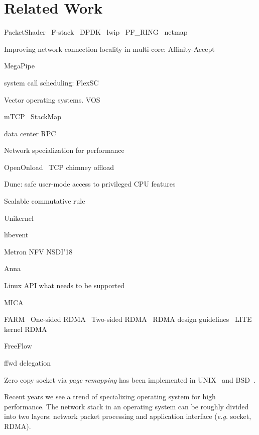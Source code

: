 \section{Related Work}
\label{sec:related}

PacketShader~\cite{han2010packetshader}
F-stack~\cite{fstack}
DPDK~\cite{dpdk} lwip~\cite{dunkels2001design}
PF\_RING~\cite{pf_ring}
netmap~\cite{rizzo2012netmap}

Improving network connection locality in multi-core:
Affinity-Accept~\cite{pesterev2012improving}


MegaPipe~\cite{han2012megapipe}

system call scheduling:
FlexSC~\cite{soares2010flexsc}

Vector operating systems.
VOS~\cite{vasudevan2011case}

mTCP~\cite{jeong2014mtcp}
StackMap~\cite{yasukata2016stackmap}

data center RPC~\cite{stuedi2014darpc}

Network specialization for performance~\cite{marinos2014network}

OpenOnload~\cite{openonload}
TCP chimney offload~\cite{networking2004network}

Dune: safe user-mode access to privileged CPU features~\cite{belay2012dune}

Scalable commutative rule~\cite{clements2015scalable}

Unikernel~\cite{madhavapeddy2013unikernels}

libevent~\cite{libevent}

Metron NFV NSDI'18~\cite{metron2018nsdi}

Anna~\cite{anna}

Linux API what needs to be supported~\cite{tsai2016study}

MICA~\cite{lim2014mica}

FARM~\cite{dragojevic2014farm}
One-sided RDMA~\cite{mitchell2013using}
Two-sided RDMA~\cite{kalia2014using}
RDMA design guidelines~\cite{kaminsky2016design}
LITE kernel RDMA~\cite{tsai2017lite}

FreeFlow~\cite{freeflow}


ffwd delegation~\cite{roghanchi2017ffwd}

Zero copy socket via \textit{page remapping} has been implemented in UNIX~\cite{thadani1995efficient} and BSD~\cite{chu1996zero}. 

Recent years we see a trend of specializing operating system for high performance.
The network stack in an operating system can be roughly divided into two layers: network packet processing and application interface (\textit{e.g.} socket, RDMA).

